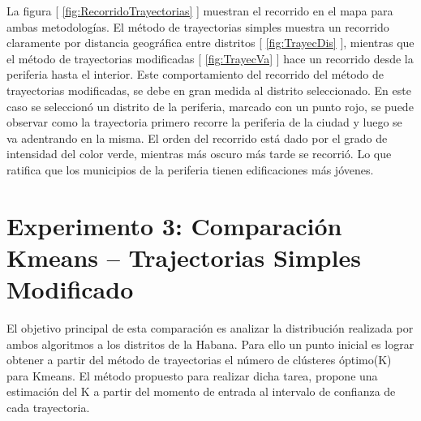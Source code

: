La figura [ \ref{fig:RecorridoTrayectorias} ]  muestran el recorrido en el mapa para ambas metodologías. El método de trayectorias simples muestra un recorrido claramente por distancia geográfica entre distritos [ \ref{fig:TrayecDis} ], mientras que el método de trayectorias modificadas [ \ref{fig:TrayecVa} ] hace un recorrido desde la periferia hasta el interior. Este comportamiento del recorrido del método de trayectorias modificadas, se debe en gran medida al distrito seleccionado. En este caso se seleccionó un distrito de la periferia, marcado con un punto rojo, se puede observar como la trayectoria primero recorre la periferia de la ciudad y luego se va adentrando en la misma. El orden del recorrido está dado por el grado de intensidad del color verde, mientras más oscuro más tarde se recorrió. Lo que ratifica que los municipios de la periferia tienen edificaciones más jóvenes.

\section{Experimento 3: Comparación Kmeans – Trajectorias Simples Modificado}
El objetivo principal de esta comparación es analizar la distribución realizada por ambos algoritmos a los distritos de la Habana. Para ello un punto inicial es lograr obtener a partir del método de trayectorias el número de clústeres óptimo(K) para Kmeans. El método propuesto para realizar dicha tarea, propone una estimación del K a partir del momento de entrada al intervalo de confianza de cada trayectoria.

